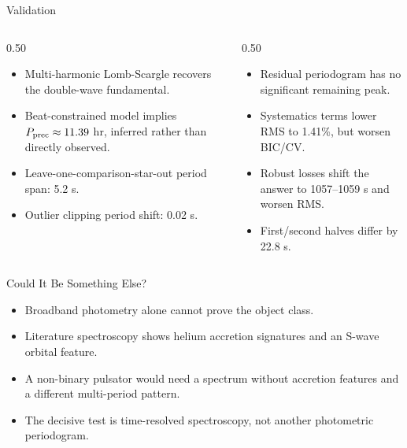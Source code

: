 \documentclass[aspectratio=169]{beamer}
\begin{document}
\begin{frame}{Validation}
  \small
  \begin{columns}
    \begin{column}{0.50\textwidth}
      \begin{itemize}
        \item Multi-harmonic Lomb-Scargle recovers the double-wave fundamental.
        \item Beat-constrained model implies \(P_{\rm prec}\approx 11.39\) hr, inferred rather than directly observed.
        \item Leave-one-comparison-star-out period span: 5.2 s.
        \item Outlier clipping period shift: 0.02 s.
      \end{itemize}
    \end{column}
    \begin{column}{0.50\textwidth}
      \begin{itemize}
        \item Residual periodogram has no significant remaining peak.
        \item Systematics terms lower RMS to 1.41\%, but worsen BIC/CV.
        \item Robust losses shift the answer to 1057--1059 s and worsen RMS.
        \item First/second halves differ by 22.8 s.
      \end{itemize}
    \end{column}
  \end{columns}
\end{frame}

\begin{frame}{Could It Be Something Else?}
  \begin{itemize}
    \item Broadband photometry alone cannot prove the object class.
    \item Literature spectroscopy shows helium accretion signatures and an S-wave orbital feature.
    \item A non-binary pulsator would need a spectrum without accretion features and a different multi-period pattern.
    \item The decisive test is time-resolved spectroscopy, not another photometric periodogram.
  \end{itemize}
\end{frame}
\end{document}
